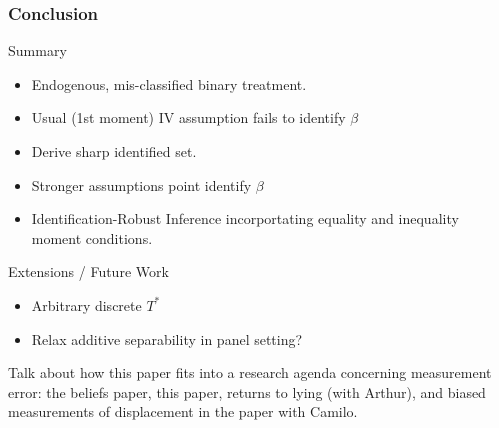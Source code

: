 \documentclass{beamer}
\begin{document}
\begin{frame}
  \frametitle{Conclusion}

  \begin{block}{Summary}
  \begin{itemize}
    \item Endogenous, mis-classified binary treatment.
      \item Usual (1st moment) IV assumption fails to identify $\beta$
    \item Derive sharp identified set.
      \item Stronger assumptions point identify $\beta$
      \item Identification-Robust Inference incorportating equality and inequality moment conditions.
   \end{itemize}
 \end{block}

 \begin{block}{Extensions / Future Work}
   \begin{itemize}
 \item Arbitrary discrete $T^*$
 \item Relax additive separability in panel setting?
 \end{itemize}
 \end{block}

\end{frame}
\begin{frame}
  Talk about how this paper fits into a research agenda concerning measurement error: the beliefs paper, this paper, returns to lying (with Arthur), and biased measurements of displacement in the paper with Camilo.
\end{frame}

\appendix
\end{document}
